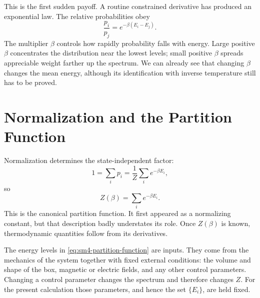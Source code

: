 This is the first sudden payoff.  A routine constrained derivative has
produced an exponential law.  The relative probabilities obey
\begin{equation}
 \frac{p_i}{p_j}=e^{-\beta(E_i-E_j)}.
 \label{eq:sm4-relative-weight}
\end{equation}
The multiplier \(\beta\) controls how rapidly probability falls with
energy.  Large positive \(\beta\) concentrates the distribution near the
lowest levels; small positive \(\beta\) spreads appreciable weight farther
up the spectrum.  We can already see that changing \(\beta\) changes the
mean energy, although its identification with inverse temperature still
has to be proved.

\section{Normalization and the Partition Function}

Normalization determines the state-independent factor:
\begin{equation}
 1=\sum_i p_i
 =\frac{1}{Z}\sum_i e^{-\beta E_i},
\end{equation}
so
\begin{equation}
 Z(\beta)=\sum_i e^{-\beta E_i}.
 \label{eq:sm4-partition-function}
\end{equation}
This is the canonical partition function.  It first appeared as a
normalizing constant, but that description badly understates its role.
Once \(Z(\beta)\) is known, thermodynamic quantities follow from its
derivatives.

The energy levels in \eqref{eq:sm4-partition-function} are inputs.  They
come from the mechanics of the system together with fixed external
conditions: the volume and shape of the box, magnetic or electric fields,
and any other control parameters.  Changing a control parameter changes
the spectrum and therefore changes \(Z\).  For the present calculation
those parameters, and hence the set \(\{E_i\}\), are held fixed.

\begin{classroomqa}
\end{classroomqa}

